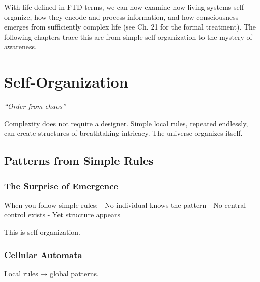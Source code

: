 \documentclass[
  11pt,
  letterpaper,
  twoside,
  openright]{book}
\begin{document}
With life defined in FTD terms, we can now examine how living systems
self-organize, how they encode and process information, and how
consciousness emerges from sufficiently complex life (see Ch. 21 for the
formal treatment). The following chapters trace this arc from simple
self-organization to the mystery of awareness.

\chapter{Self-Organization}\label{sec-self-organization}

\emph{``Order from chaos''}

\begin{tcolorbox}[enhanced jigsaw, leftrule=.75mm, title=\textcolor{quarto-callout-note-color}{\faInfo}\hspace{0.5em}{Key Revelation}, bottomrule=.15mm, opacityback=0, coltitle=black, arc=.35mm, colframe=quarto-callout-note-color-frame, colbacktitle=quarto-callout-note-color!10!white, colback=white, titlerule=0mm, breakable, bottomtitle=1mm, toptitle=1mm, rightrule=.15mm, toprule=.15mm, left=2mm, opacitybacktitle=0.6]

Complexity does not require a designer. Simple local rules, repeated
endlessly, can create structures of breathtaking intricacy. The universe
organizes itself.

\end{tcolorbox}

\section{Patterns from Simple Rules}\label{patterns-from-simple-rules}

\subsection{The Surprise of Emergence}\label{the-surprise-of-emergence}

When you follow simple rules: - No individual knows the pattern - No
central control exists - Yet structure appears

This is self-organization.

\subsection{Cellular Automata}\label{cellular-automata}

Local rules → global patterns.
\end{document}
